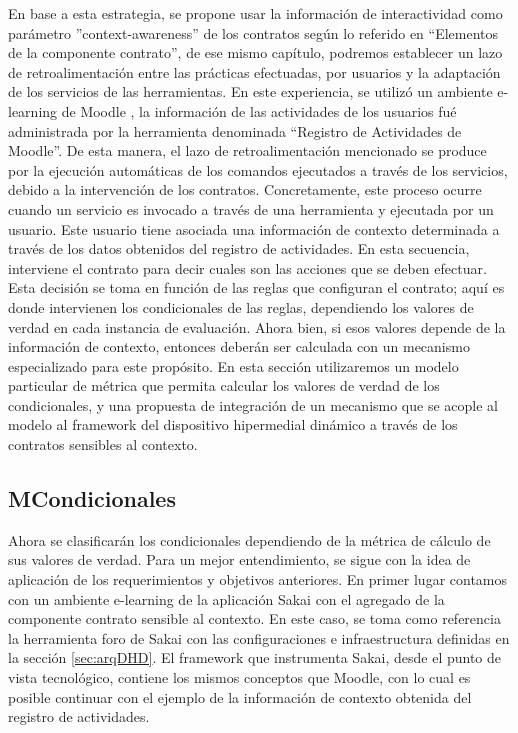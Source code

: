 En base a esta estrategia, se propone usar la información de interactividad como parámetro ''context-awareness'' de los contratos según lo referido en “Elementos de la componente contrato”, de ese mismo capítulo, podremos establecer un lazo de retroalimentación entre las prácticas efectuadas, por usuarios y la adaptación de los servicios de las herramientas. En este experiencia, se utilizó un ambiente e-learning de Moodle \cite{Moodle}, la información de las actividades de los usuarios fué administrada por la herramienta denominada ``Registro de Actividades de Moodle''. De esta manera, el lazo de retroalimentación mencionado se produce por la ejecución automáticas de los comandos ejecutados a través de los servicios, debido a la intervención de los contratos. Concretamente, este proceso ocurre cuando un servicio es invocado a través de una herramienta y ejecutada por un usuario. Este usuario tiene asociada una información de contexto determinada a través de los datos obtenidos del registro de actividades. En esta secuencia, interviene el contrato para decir cuales son las acciones que se deben efectuar. Esta decisión se toma en función de las reglas que configuran el contrato; aquí es donde intervienen los condicionales de las reglas, dependiendo los valores de verdad en cada instancia de evaluación. Ahora bien, si esos valores depende de la información de contexto, entonces deberán ser calculada con un mecanismo especializado para este propósito. En esta sección utilizaremos un modelo particular de métrica que permita calcular los valores de verdad de los condicionales, y una propuesta de integración de un mecanismo que se acople al modelo al framework del dispositivo hipermedial dinámico a través de los contratos sensibles al contexto.




\subsection{MCondicionales}


Ahora se clasificarán los condicionales dependiendo de la métrica de cálculo de sus valores de verdad. Para un mejor entendimiento, se sigue con la idea de aplicación de los requerimientos y objetivos anteriores. En primer lugar contamos con un ambiente e-learning de la aplicación Sakai con el agregado de la componente contrato sensible al contexto. En este caso, se toma como referencia la herramienta foro de Sakai con las configuraciones e infraestructura definidas en la sección \ref{sec:arqDHD}. El framework que instrumenta Sakai, desde el punto de vista tecnológico, contiene los mismos conceptos que Moodle, con lo cual es posible continuar con el ejemplo de la información de contexto obtenida del registro de actividades. 


